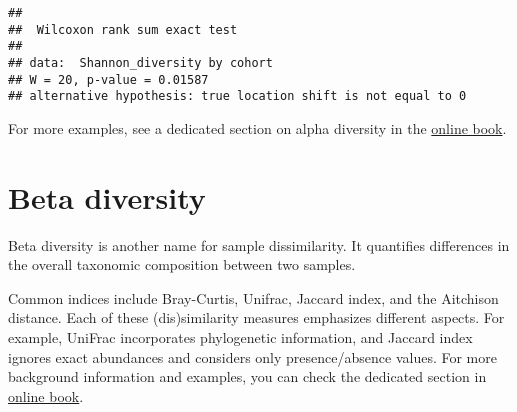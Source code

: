 \documentclass[
  oneside]{book}
\newenvironment{Shaded}{\begin{snugshade}}{\end{snugshade}}
\newcommand{\CommentTok}[1]{\textcolor[rgb]{0.56,0.35,0.01}{\textit{#1}}}
\newcommand{\DataTypeTok}[1]{\textcolor[rgb]{0.13,0.29,0.53}{#1}}
\newcommand{\KeywordTok}[1]{\textcolor[rgb]{0.13,0.29,0.53}{\textbf{#1}}}
\newcommand{\NormalTok}[1]{#1}
\newcommand{\OperatorTok}[1]{\textcolor[rgb]{0.81,0.36,0.00}{\textbf{#1}}}
\newcommand{\StringTok}[1]{\textcolor[rgb]{0.31,0.60,0.02}{#1}}
\begin{document}
\begin{Shaded}
\end{Shaded}

\begin{verbatim}
## 
##  Wilcoxon rank sum exact test
## 
## data:  Shannon_diversity by cohort
## W = 20, p-value = 0.01587
## alternative hypothesis: true location shift is not equal to 0
\end{verbatim}

For more examples, see a dedicated section on alpha diversity in the
\href{https://microbiome.github.io/OMA/}{online book}.

\hypertarget{beta-diversity}{%
\chapter{Beta diversity}\label{beta-diversity}}

Beta diversity is another name for sample dissimilarity. It quantifies
differences in the overall taxonomic composition between two samples.

Common indices include Bray-Curtis, Unifrac, Jaccard index, and the
Aitchison distance. Each of these (dis)similarity measures emphasizes
different aspects. For example, UniFrac incorporates phylogenetic
information, and Jaccard index ignores exact abundances and considers
only presence/absence values. For more background information
and examples, you can check the dedicated section in \href{https://microbiome.github.io/OMA/microbiome-diversity.html\#beta-diversity}{online
book}.
\end{document}

